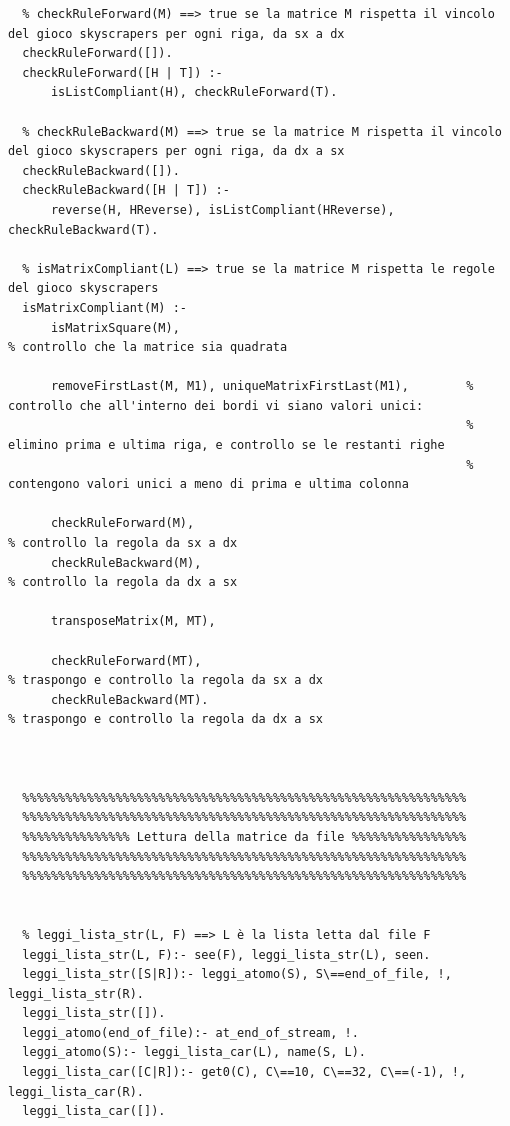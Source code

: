 \documentclass{article}
\begin{document}
\begin{lstlisting}
  % checkRuleForward(M) ==> true se la matrice M rispetta il vincolo del gioco skyscrapers per ogni riga, da sx a dx
  checkRuleForward([]).
  checkRuleForward([H | T]) :-
      isListCompliant(H), checkRuleForward(T).
  
  % checkRuleBackward(M) ==> true se la matrice M rispetta il vincolo del gioco skyscrapers per ogni riga, da dx a sx
  checkRuleBackward([]).
  checkRuleBackward([H | T]) :-
      reverse(H, HReverse), isListCompliant(HReverse), checkRuleBackward(T).
  
  % isMatrixCompliant(L) ==> true se la matrice M rispetta le regole del gioco skyscrapers
  isMatrixCompliant(M) :-
      isMatrixSquare(M), 																				% controllo che la matrice sia quadrata
  
      removeFirstLast(M, M1), uniqueMatrixFirstLast(M1),        % controllo che all'interno dei bordi vi siano valori unici:
                                                                % elimino prima e ultima riga, e controllo se le restanti righe
                                                                % contengono valori unici a meno di prima e ultima colonna
  
      checkRuleForward(M),																			% controllo la regola da sx a dx
      checkRuleBackward(M),																			% controllo la regola da dx a sx
  
      transposeMatrix(M, MT),
  
      checkRuleForward(MT),																			% traspongo e controllo la regola da sx a dx
      checkRuleBackward(MT).																		% traspongo e controllo la regola da dx a sx
  
  

  %%%%%%%%%%%%%%%%%%%%%%%%%%%%%%%%%%%%%%%%%%%%%%%%%%%%%%%%%%%%%%
  %%%%%%%%%%%%%%%%%%%%%%%%%%%%%%%%%%%%%%%%%%%%%%%%%%%%%%%%%%%%%%
  %%%%%%%%%%%%%%% Lettura della matrice da file %%%%%%%%%%%%%%%%
  %%%%%%%%%%%%%%%%%%%%%%%%%%%%%%%%%%%%%%%%%%%%%%%%%%%%%%%%%%%%%%
  %%%%%%%%%%%%%%%%%%%%%%%%%%%%%%%%%%%%%%%%%%%%%%%%%%%%%%%%%%%%%%
  
  
  % leggi_lista_str(L, F) ==> L è la lista letta dal file F
  leggi_lista_str(L, F):- see(F), leggi_lista_str(L), seen.
  leggi_lista_str([S|R]):- leggi_atomo(S), S\==end_of_file, !, leggi_lista_str(R).
  leggi_lista_str([]).
  leggi_atomo(end_of_file):- at_end_of_stream, !.
  leggi_atomo(S):- leggi_lista_car(L), name(S, L).
  leggi_lista_car([C|R]):- get0(C), C\==10, C\==32, C\==(-1), !, leggi_lista_car(R).
  leggi_lista_car([]).
  

\end{lstlisting}
\end{document}
